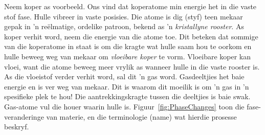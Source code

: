 \vspace{-.5cm}
      \label{m38730*id309053}Neem koper as voorbeeld. Ons vind dat koperatome min energie het in die vaste stof fase. Hulle vibreer in vaste posisies. Die atome is dig (styf) teen mekaar gepak in 'n reëlmatige, ordelike patroon, bekend as 'n \textsl{kristallyne rooster}. As koper verhit word, neem die energie van die atome toe. Dit beteken dat sommige van die koperatome in staat is om die kragte wat hulle saam hou te oorkom en hulle beweeg weg van mekaar om \textsl{vloeibare koper} te vorm. Vloeibare koper kan vloei, want die atome beweeg meer vrylik as wanneer hulle in die vaste rooster is. As die vloeistof verder verhit word, sal dit 'n gas word. Gasdeeltjies het baie energie en is ver weg van mekaar. Dit is waarom dit moeilik is om 'n gas in 'n spesifieke plek te hou! Die aantrekkingskragte tussen die deeltjies is baie swak. Gas-atome vul die houer waarin hulle is. Figuur~\ref{fig:PhaseChanges} toon die fase-veranderinge van materie, en die terminologie (name) wat hierdie prosesse beskryf.
    
